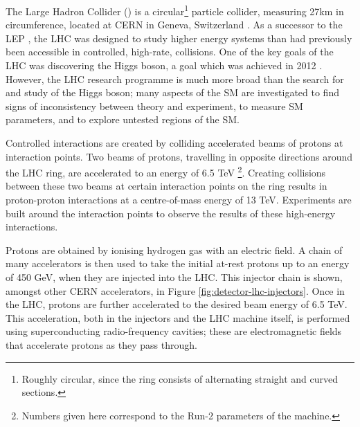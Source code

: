 
The Large Hadron Collider () is a circular\footnote{
  Roughly circular, since the ring consists of alternating straight and curved
  sections.
}
particle collider, measuring 27km
in circumference, located at \ac{CERN} in Geneva, Switzerland
\cite{LHCVol1,LHCVol2,LHCVol3}.
As a successor to the \ac{LEP} \cite{Assmann2002},
the \ac{LHC} was designed to study higher energy systems than had previously
been accessible in controlled, high-rate, collisions. One of the key goals of
the \ac{LHC} was discovering the Higgs boson, a goal which was achieved in 2012
\cite{Higgs2012a,Higgs2012b,Higgs2013}. However, the \ac{LHC} research programme
is much more broad than the search for and study of the Higgs boson; many aspects of
the \ac{SM} are investigated to find signs of inconsistency between theory and
experiment, to measure \ac{SM} parameters, and to explore untested regions of
the \ac{SM}.

Controlled interactions are created by colliding accelerated beams of protons at
interaction points.  Two beams of protons, travelling in opposite directions
around the \ac{LHC} ring, are accelerated to an energy of 6.5 TeV \footnote{
  Numbers given here correspond to the Run-2 parameters of the machine.
}.
Creating collisions between these two beams at certain interaction points on the
ring results in proton-proton interactions at a centre-of-mass energy of 13 TeV.
Experiments are built around the interaction points to observe the results of
these high-energy interactions.

Protons are obtained by ionising hydrogen gas with an electric field. A chain of
many accelerators is then used to take the initial at-rest protons up to an
energy of 450 GeV, when they are injected into the \ac{LHC}. This injector
chain is shown, amongst other \ac{CERN} accelerators, in Figure
\ref{fig:detector-lhc-injectors}. Once in the \ac{LHC}, protons are further
accelerated to the desired beam energy of 6.5 TeV.
This acceleration, both in the injectors and the \ac{LHC} machine itself, is
performed using superconducting radio-frequency cavities; these are
electromagnetic fields that accelerate protons as they pass through.

